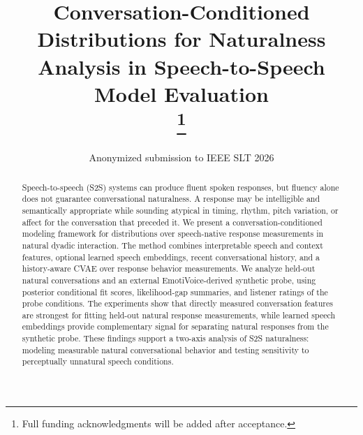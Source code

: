 \documentclass[conference]{IEEEtran}
\begin{document}
\title{Conversation-Conditioned Distributions for Naturalness Analysis in Speech-to-Speech Model Evaluation\\
\thanks{Full funding acknowledgments will be added after acceptance.}
}

\author{Anonymized submission to IEEE SLT 2026}

\maketitle

\begin{abstract}
Speech-to-speech (S2S) systems can produce fluent spoken responses, but fluency alone does not guarantee conversational naturalness.
A response may be intelligible and semantically appropriate while sounding atypical in timing, rhythm, pitch variation, or affect for the conversation that preceded it.
We present a conversation-conditioned modeling framework for distributions over speech-native response measurements in natural dyadic interaction.
The method combines interpretable speech and context features, optional learned speech embeddings, recent conversational history, and a history-aware CVAE over response behavior measurements.
We analyze held-out natural conversations and an external EmotiVoice-derived synthetic probe, using posterior conditional fit scores, likelihood-gap summaries, and listener ratings of the probe conditions.
The experiments show that directly measured conversation features are strongest for fitting held-out natural response measurements, while learned speech embeddings provide complementary signal for separating natural responses from the synthetic probe.
These findings support a two-axis analysis of S2S naturalness: modeling measurable natural conversational behavior and testing sensitivity to perceptually unnatural speech conditions.
\end{abstract}
\end{document}
